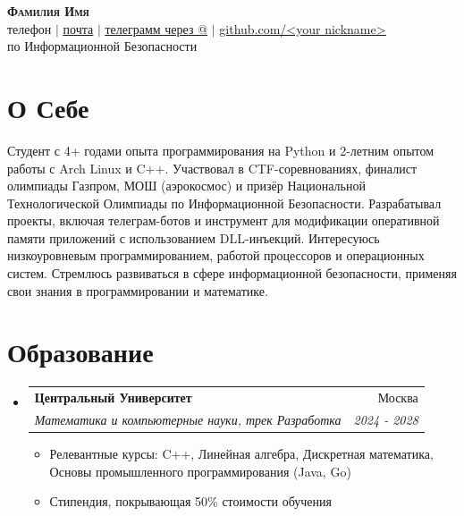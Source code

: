 \documentclass[letterpaper,11pt]{article}
\makeatletter
\newcommand{\resumeItem}[1]{
  \item\small{
    {#1 \vspace{-2pt}}
  }
}
\newcommand{\resumeSubheading}[4]{
  \vspace{-2pt}\item
    \begin{tabular*}{0.97\textwidth}[t]{l@{\extracolsep{\fill}}r}
      \textbf{#1} & #2 \\
      \textit{\small#3} & \textit{\small #4} \\
    \end{tabular*}\vspace{-7pt}
}
\newcommand{\resumeSubHeadingListStart}{\begin{itemize}[leftmargin=0.15in, label={}]}
\newcommand{\resumeSubHeadingListEnd}{\end{itemize}}
\newcommand{\resumeItemListStart}{\begin{itemize}}
\newcommand{\resumeItemListEnd}{\end{itemize}\vspace{-5pt}}
\makeatother
\begin{document}
\begin{center}
    \textbf{\Huge \scshape Фамилия Имя} \\ \vspace{1pt}
    \small телефон $|$ \href{mailto:x@x.com}{\underline{почта}} $|$ 
    \href{https://t.me/}{\underline{телеграмм через @}} $|$
    \href{https://github.com/}{\underline{github.com/<your nickname>}} \\ \vspace{2pt}
     по Информационной Безопасности
\end{center}


\section{О Себе}
 \begin{itemize}[leftmargin=0.15in, label={}]
    \small{\item{
     Студент с 4+ годами опыта программирования на Python и 2-летним опытом работы с Arch Linux и C++. Участвовал в CTF-соревнованиях, финалист олимпиады Газпром, МОШ (аэрокосмос) и призёр Национальной Технологической Олимпиады по Информационной Безопасности. Разрабатывал проекты, включая телеграм-ботов и инструмент для модификации оперативной памяти приложений с использованием DLL-инъекций. Интересуюсь низкоуровневым программированием, работой процессоров и операционных систем. Стремлюсь развиваться в сфере информационной безопасности, применяя свои знания в программировании и математике.  
    }} 
 \end{itemize}


\section{Образование}
  \resumeSubHeadingListStart
    \resumeSubheading
      {Центральный Университет}{Москва}
      {Математика и компьютерные науки, трек Разработка}{2024 - 2028}
    \resumeItemListStart
      \resumeItem{Релевантные курсы: C++, Линейная алгебра, Дискретная математика, Основы промышленного программирования (Java, Go)}
      \resumeItem{Стипендия, покрывающая 50\% стоимости обучения}
    \resumeItemListEnd
  \resumeSubHeadingListEnd


\end{document}
